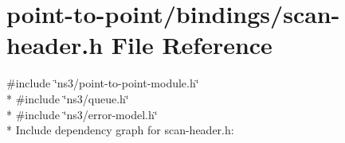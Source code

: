 \hypertarget{point-to-point_2bindings_2scan-header_8h}{}\section{point-\/to-\/point/bindings/scan-\/header.h File Reference}
\label{point-to-point_2bindings_2scan-header_8h}
{\ttfamily \#include \char`\"{}ns3/point-\/to-\/point-\/module.\+h\char`\"{}}\\*
{\ttfamily \#include \char`\"{}ns3/queue.\+h\char`\"{}}\\*
{\ttfamily \#include \char`\"{}ns3/error-\/model.\+h\char`\"{}}\\*
Include dependency graph for scan-\/header.h\+:
